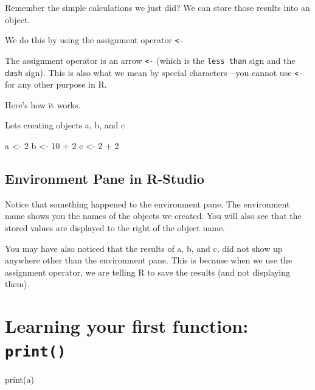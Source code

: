 \documentclass[
]{book}
\newenvironment{Shaded}{\begin{snugshade}}{\end{snugshade}}
\newcommand{\DecValTok}[1]{\textcolor[rgb]{0.00,0.00,0.81}{#1}}
\newcommand{\FunctionTok}[1]{\textcolor[rgb]{0.00,0.00,0.00}{#1}}
\newcommand{\NormalTok}[1]{#1}
\newcommand{\OtherTok}[1]{\textcolor[rgb]{0.56,0.35,0.01}{#1}}
\newcommand{\SpecialCharTok}[1]{\textcolor[rgb]{0.00,0.00,0.00}{#1}}
\begin{document}
Remember the simple calculations we just did? We can store those results into an object.

We do this by using the assignment operator \texttt{\textless{}-}

The assignment operator is an arrow \texttt{\textless{}-} (which is the \texttt{less\ than} sign and the \texttt{dash} sign). This is also what we mean by special characters---you cannot use \texttt{\textless{}-} for any other purpose in R.

Here's how it works.

Lets creating objects a, b, and c

\begin{Shaded}
\begin{Highlighting}[]
\NormalTok{a }\OtherTok{\textless{}{-}} \DecValTok{2}
\NormalTok{b }\OtherTok{\textless{}{-}} \DecValTok{10} \SpecialCharTok{+} \DecValTok{2}
\NormalTok{c }\OtherTok{\textless{}{-}} \DecValTok{2} \SpecialCharTok{+} \DecValTok{2}
\end{Highlighting}
\end{Shaded}

\hypertarget{environment-pane-in-r-studio}{%
\subsection{Environment Pane in R-Studio}\label{environment-pane-in-r-studio}}

Notice that something happened to the environment pane. The environment name shows you the names of the objects we created. You will also see that the stored values are displayed to the right of the object name.

You may have also noticed that the results of a, b, and c, did not show up anywhere other than the environment pane. This is because when we use the assignment operator, we are telling R to save the results (and not displaying them).

\hypertarget{learning-your-first-function-print}{%
\section{\texorpdfstring{Learning your first function: \texttt{print()}}{Learning your first function: print()}}\label{learning-your-first-function-print}}

\begin{Shaded}
\begin{Highlighting}[]
\FunctionTok{print}\NormalTok{(a)}
\end{Highlighting}
\end{Shaded}
\end{document}
